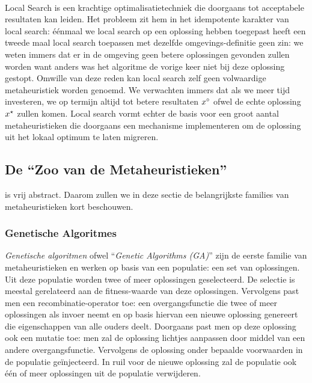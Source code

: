 \paragraph{}
Local Search is een krachtige optimalisatietechniek die doorgaans tot acceptabele resultaten kan leiden. Het probleem zit hem in het idempotente karakter van local search: \'e\'enmaal we local search op een oplossing hebben toegepast heeft een tweede maal local search toepassen met dezelfde omgevings-definitie geen zin: we weten immers dat er in de omgeving geen betere oplossingen gevonden zullen worden want anders was het algoritme de vorige keer niet bij deze oplossing gestopt. Omwille van deze reden kan local search zelf geen volwaardige metaheuristiek worden genoemd. We verwachten immers dat als we meer tijd investeren, we op termijn altijd tot betere resultaten $x^{\circ}$ ofwel de echte oplossing $x^{\star}$ zullen komen. Local search vormt echter de basis voor een groot aantal metaheuristieken die doorgaans een mechanisme implementeren om de oplossing uit het lokaal optimum te laten migreren.

\subsection{De ``Zoo van de Metaheuristieken''}

 is vrij abstract. Daarom zullen we in deze sectie de belangrijkste families van metaheuristieken kort beschouwen.

\subsubsection{Genetische Algoritmes}

\emph{Genetische algoritmen} ofwel ``\emph{Genetic Algorithms (GA)}'' zijn de eerste familie van metaheuristieken en werken op basis van een populatie: een set van oplossingen. Uit deze populatie worden twee of meer oplossingen geselecteerd. De selectie is meestal gerelateerd aan de fitness-waarde van deze oplossingen. Vervolgens past men een recombinatie-operator toe: een overgangsfunctie die twee of meer oplossingen als invoer neemt en op basis hiervan een nieuwe oplossing genereert die eigenschappen van alle ouders deelt. Doorgaans past men op deze oplossing ook een mutatie toe: men zal de oplossing lichtjes aanpassen door middel van een andere overgangsfunctie. Vervolgens de oplossing onder bepaalde voorwaarden in de populatie ge\"injecteerd. In ruil voor de nieuwe oplossing zal de populatie ook \'e\'en of meer oplossingen uit de populatie verwijderen.

